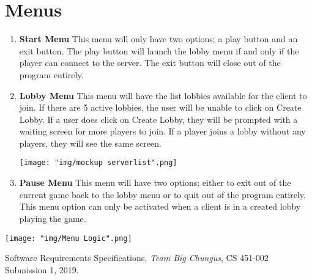 \documentclass{scrreprt}
\begin{document}
	\section{Menus}
		\begin{enumerate} [label*=\arabic*.]
		\item \textbf{Start Menu}
			This menu will only have two options; a play button and an exit button. The play button will launch the lobby menu if and only if the player can connect to the server. The exit button will close out of the program entirely. 

		\item \textbf{Lobby Menu}
			This menu will have the list lobbies available for the client to join. If there are 5 active lobbies, the user will be unable to click on Create Lobby. If a user does click on Create Lobby, they will be prompted with a waiting screen for more players to join. If a player joins a lobby without any players, they will see the same screen.

\texttt{[image: "img/mockup serverlist".png]}

		\item \textbf{Pause Menu}
			This menu will have two options; either to exit out of the current game back to the lobby menu or to quit out of the program entirely. This menu option can only be activated when a client is in a created lobby playing the game.
		\end{enumerate}

		\texttt{[image: "img/Menu Logic".png]}

\begin{thebibliography}{9}

  Software Requirements Specifications,
  \textit{Team Big Chungus},
  CS 451-002 Submission 1,
  2019.

\end{thebibliography}
\end{document}
